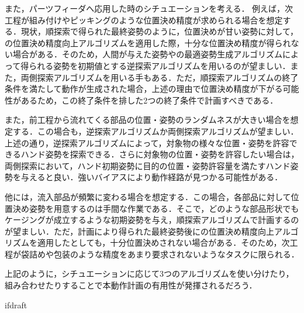 \documentclass[a4paper,twoside,12pt,papersize, dvipdfmx]{iirthesis}
\begin{document}
また，パーツフィーダへ応用した時のシチュエーションを考える．
例えば，次工程が組み付けやピッキングのような位置決め精度が求められる場合を想定する．現状，順探索で得られた最終姿勢のように，位置決めが甘い姿勢に対して，の位置決め精度向上アルゴリズムを適用した際，十分な位置決め精度が得られない場合がある．そのため，人間が与えた姿勢やの最適姿勢生成アルゴリズムによって得られる姿勢を初期値とする逆探索アルゴリズムを用いるのが望ましい．また，両側探索アルゴリズムを用いる手もある．ただ，順探索アルゴリズムの終了条件を満たして動作が生成された場合，上述の理由で位置決め精度が下がる可能性があるため，この終了条件を排した2つの終了条件で計画すべきである．\par
また，前工程から流れてくる部品の位置・姿勢のランダムネスが大きい場合を想定する．この場合も，逆探索アルゴリズムか両側探索アルゴリズムが望ましい．上述の通り，逆探索アルゴリズムによって，対象物の様々な位置・姿勢を許容できるハンド姿勢を探索できる．さらに対象物の位置・姿勢を許容したい場合は，両側探索において，ハンド初期姿勢に目的の位置・姿勢許容量を満たすハンド姿勢を与えると良い．強いバイアスにより動作経路が見つかる可能性がある．\par
他には，流入部品が頻繁に変わる場合を想定する．この場合，各部品に対して位置決め姿勢を用意するのは手間な作業である．そこで，どのような部品形状でもケージングが成立するような初期姿勢を与え，順探索アルゴリズムで計画するのが望ましい．ただ，計画により得られた最終姿勢後にの位置決め精度向上アルゴリズムを適用したとしても，十分位置決めされない場合がある．そのため，次工程が袋詰めや包装のような精度をあまり要求されないようなタスクに限られる．\par

上記のように，シチュエーションに応じて3つのアルゴリズムを使い分けたり，組み合わせたりすることで本動作計画の有用性が発揮されるだろう．

\expandafter\ifx\csname ifdraft\endcsname\relax
    
\end{document}
